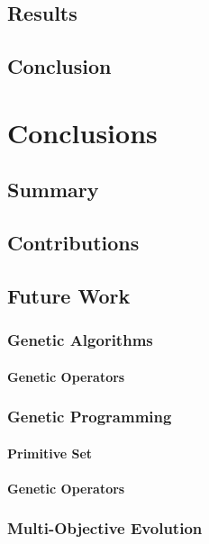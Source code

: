   \section{Results}
  \label{sec:results}
    \Blindtext
  \section{Conclusion}
  \label{sec:conclusion}
    \Blindtext

\chapter{Conclusions}
\label{chap:conclusions}
  \section{Summary}
  \label{sec:summary}
    \Blindtext
  \section{Contributions}
  \label{sec:contributions}
    \Blindtext
  \section{Future Work}
  \label{sec:future_work}
    \subsection{Genetic Algorithms}
    \label{sec:future:ga}
      \subsubsection{Genetic Operators}
      \label{sec:future:ga:operators}
        \Blindtext
    \subsection{Genetic Programming}
    \label{sec:future:gp}
      \subsubsection{Primitive Set}
      \label{sec:future:gp:primitive_set}
        \Blindtext
      \subsubsection{Genetic Operators}
      \label{sec:future:gp:operators}
        \Blindtext
    \subsection{Multi-Objective Evolution}
    \label{sec:future:moe}
      \Blindtext
